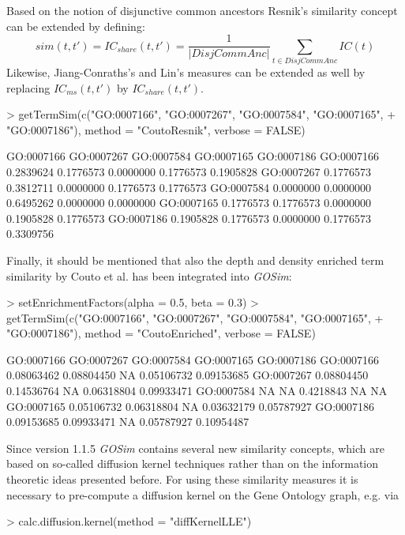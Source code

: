 \documentclass[12pt,a4paper]{article}
\begin{document}
Based on the notion of disjunctive common ancestors Resnik's similarity concept can be extended by defining:
\begin{equation}
sim(t,t') = IC_{share}(t,t') = \frac{1}{|DisjCommAnc|}\sum_{t\in DisjCommAnc} IC(t)
\end{equation}
Likewise, Jiang-Conraths's and Lin's measures can be extended as well by replacing $IC_{ms}(t,t')$ by $IC_{share}(t,t')$.
\begin{Schunk}
\begin{Sinput}
> getTermSim(c("GO:0007166", "GO:0007267", "GO:0007584", "GO:0007165", 
+     "GO:0007186"), method = "CoutoResnik", verbose = FALSE)
\end{Sinput}
\begin{Soutput}
           GO:0007166 GO:0007267 GO:0007584 GO:0007165 GO:0007186
GO:0007166  0.2839624  0.1776573  0.0000000  0.1776573  0.1905828
GO:0007267  0.1776573  0.3812711  0.0000000  0.1776573  0.1776573
GO:0007584  0.0000000  0.0000000  0.6495262  0.0000000  0.0000000
GO:0007165  0.1776573  0.1776573  0.0000000  0.1905828  0.1776573
GO:0007186  0.1905828  0.1776573  0.0000000  0.1776573  0.3309756
\end{Soutput}
\end{Schunk}

Finally, it should be mentioned that also the depth and density enriched term similarity by Couto et al. \cite{Couto2003FuSSiMeg} has been integrated into \emph{GOSim}:
\begin{Schunk}
\begin{Sinput}
> setEnrichmentFactors(alpha = 0.5, beta = 0.3)
> getTermSim(c("GO:0007166", "GO:0007267", "GO:0007584", "GO:0007165", 
+     "GO:0007186"), method = "CoutoEnriched", verbose = FALSE)
\end{Sinput}
\begin{Soutput}
           GO:0007166 GO:0007267 GO:0007584 GO:0007165 GO:0007186
GO:0007166 0.08063462 0.08804450         NA 0.05106732 0.09153685
GO:0007267 0.08804450 0.14536764         NA 0.06318804 0.09933471
GO:0007584         NA         NA  0.4218843         NA         NA
GO:0007165 0.05106732 0.06318804         NA 0.03632179 0.05787927
GO:0007186 0.09153685 0.09933471         NA 0.05787927 0.10954487
\end{Soutput}
\end{Schunk}

Since version 1.1.5 \emph{GOSim} contains several new similarity concepts, which are based on so-called diffusion kernel techniques \cite{Lerman2007ManifoldEmbedding} rather than on the information theoretic ideas presented before. For using these similarity measures it is necessary to pre-compute a diffusion kernel on the Gene Ontology graph, e.g. via
\begin{Schunk}
\begin{Sinput}
> calc.diffusion.kernel(method = "diffKernelLLE")
\end{Sinput}
\end{Schunk}
\end{document}
